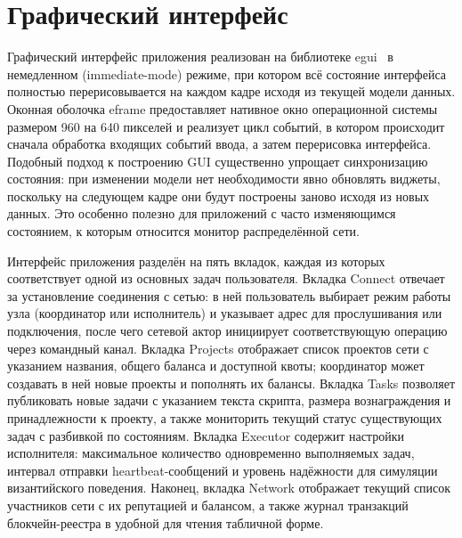 \documentclass[a4paper,11pt]{extarticle}
\begin{document}
\section{Графический интерфейс}

Графический интерфейс приложения реализован на библиотеке egui~\cite{egui_crate}
в немедленном (immediate-mode) режиме, при котором всё состояние интерфейса
полностью перерисовывается на каждом кадре исходя из текущей модели данных.
Оконная оболочка eframe предоставляет нативное окно операционной системы
размером 960 на 640 пикселей и реализует цикл событий, в котором происходит
сначала обработка входящих событий ввода, а затем перерисовка интерфейса.
Подобный подход к построению GUI существенно упрощает синхронизацию состояния:
при изменении модели нет необходимости явно обновлять виджеты, поскольку на
следующем кадре они будут построены заново исходя из новых данных. Это особенно
полезно для приложений с часто изменяющимся состоянием, к которым относится
монитор распределённой сети.

Интерфейс приложения разделён на пять вкладок, каждая из которых соответствует
одной из основных задач пользователя. Вкладка Connect отвечает за установление
соединения с сетью: в ней пользователь выбирает режим работы узла (координатор
или исполнитель) и указывает адрес для прослушивания или подключения, после
чего сетевой актор инициирует соответствующую операцию через командный канал.
Вкладка Projects отображает список проектов сети с указанием названия, общего
баланса и доступной квоты; координатор может создавать в ней новые проекты и
пополнять их балансы. Вкладка Tasks позволяет публиковать новые задачи с
указанием текста скрипта, размера вознаграждения и принадлежности к проекту,
а также мониторить текущий статус существующих задач с разбивкой по
состояниям. Вкладка Executor содержит настройки исполнителя: максимальное
количество одновременно выполняемых задач, интервал отправки heartbeat-сообщений
и уровень надёжности для симуляции византийского поведения. Наконец, вкладка
Network отображает текущий список участников сети с их репутацией и
балансом, а также журнал транзакций блокчейн-реестра в удобной для чтения
табличной форме.

\end{document}
